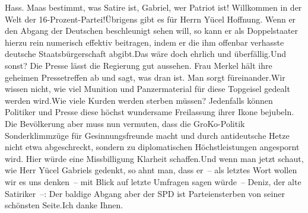 \documentclass{article}
\begin{document}
Hass. Maas bestimmt, was Satire ist, Gabriel, wer Patriot ist! Willkommen in der Welt der 16-Prozent-Partei!Übrigens gibt es für Herrn Yücel Hoffnung. Wenn er den Abgang der Deutschen beschleunigt sehen will, so kann er als Doppelstaater hierzu rein numerisch effektiv beitragen, indem er die ihm offenbar verhasste deutsche Staatsbürgerschaft abgibt.Das wäre doch ehrlich und überfällig.Und sonst? Die Presse lässt die Regierung gut aussehen. Frau Merkel hält ihre geheimen Pressetreffen ab und sagt, was dran ist. Man sorgt füreinander.Wir wissen nicht, wie viel Munition und Panzermaterial für diese Topgeisel gedealt werden wird.Wie viele Kurden werden sterben müssen? Jedenfalls können Politiker und Presse diese höchst wundersame Freilassung ihrer Ikone bejubeln. Die Bevölkerung aber muss nun vermuten, dass die GroKo-Politik Sonderklimmzüge für Gesinnungsfreunde macht und durch antideutsche Hetze nicht etwa abgeschreckt, sondern zu diplomatischen Höchstleistungen angespornt wird. Hier würde eine Missbilligung Klarheit schaffen.Und wenn man jetzt schaut, wie Herr Yücel Gabriels gedenkt, so ahnt man, dass er – als letztes Wort wollen wir es uns denken – mit Blick auf letzte Umfragen sagen würde – Deniz, der alte Satiriker –: Der baldige Abgang aber der SPD ist Parteiensterben von seiner schönsten Seite.Ich danke Ihnen.
\end{document}
